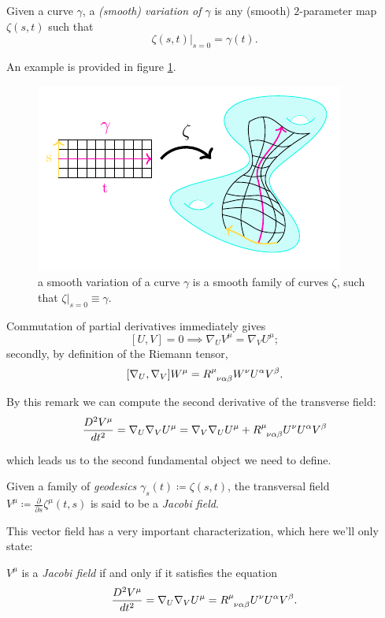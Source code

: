 \begin{definition}
	Given a curve \(\gamma\), a \emph{(smooth) variation of \(\gamma\)} is any (smooth) \(2\)-parameter map \(\zeta(s,t)\) such that 
	\[
	\left. \zeta(s, t) \right\vert_{s = 0} = \gamma(t).
	\]
\end{definition}
An example is provided in figure \ref{fig:family-curves}.
\begin{figure}
	\caption[]{a smooth variation of a curve \(\gamma\) is a smooth family of curves \(\zeta\), such that \(\zeta\vert_{s = 0} \equiv \gamma\).}
	\label{fig:family-curves}
	\centering
	\includegraphics[scale=2.2]{Immagini/family-geodesics/family-geodesics.pdf}
\end{figure}

\begin{remark}
	Commutation of partial derivatives immediately gives 
	\[
	[U, V] = 0 \implies \nabla_U V^{\mu} = \nabla_V U^{\mu};
	\]
	secondly, by definition of the Riemann tensor,
	\[
	[\nabla_U, \nabla_V]W^{\mu} = R\indices{^{\mu}_{\nu\alpha\beta}}W^{\nu}U^{\alpha}V^{\beta}.
	\]
\end{remark}

By this remark we can compute the second derivative of the transverse field:
\[
\frac{D^2\tensor{V}{^\mu} }{dt^2} = \nabla_U\nabla_V U^{\mu} = \nabla_V\nabla_U U^{\mu} + R\indices{^{\mu}_{\nu\alpha\beta}}U^{\nu}U^{\alpha}V^{\beta}
\]

which leads us to the second fundamental object we need to define. 
\begin{definition}
	Given a family of \emph{geodesics} \(\gamma_s(t) \coloneqq \zeta(s,t)\), the transversal field \(V^{\mu} \coloneqq \frac{\partial}{\partial s} \zeta^{\mu}(t,s)\) is said to be a \emph{Jacobi field}.
\end{definition}

This vector field has a very important characterization, which here we'll only state:
\begin{lemma}
\(V^{\mu}\) is a \emph{Jacobi field} if and only if it satisfies the equation
	\begin{equation}
	\label{eq:Jacobi}
		\frac{D^2\tensor{V}{^\mu} }{dt^2} = \nabla_U\nabla_V U^{\mu} =  R\indices{^{\mu}_{\nu\alpha\beta}}U^{\nu}U^{\alpha}V^{\beta}.
	\end{equation}
\end{lemma}

